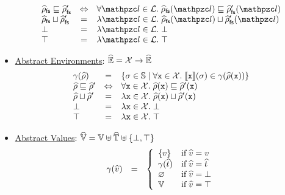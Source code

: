 \begin{itemize}
\[\begin{array}{lcl}
        \afsenv \order \afsenv' &\Leftrightarrow&
        \forall \lab \in \labset. \; \afsenv(\lab) \order \afsenv'(\lab)\\

        \afsenv \join \afsenv' &=&
        \lambda \lab \in \labset. \; \afsenv(\lab) \join \afsenv'(\lab)\\

        \bot &=& \lambda \lab \in \labset. \; \bot\\

        \top &=& \lambda \lab \in \labset. \; \top\\
      \end{array}
    \]

  \item \underline{Abstract Environments}:
    $\widehat{\mathbb{E}} = \mathcal{X} \rightarrow \widehat{\mathbb{E}}$
    \[
      \begin{array}{lcl}
        \gamma(\widehat{\rho}) &=& \{ \sigma \in \mathbb{S} \mid
          \forall \texttt{x} \in \mathcal{X}. \;
          \llbracket{\texttt{x}}\rrbracket(\sigma) \in \gamma(\widehat{\rho}(\texttt{x}))
        \}\\

        \widehat{\rho} \sqsubseteq \widehat{\rho}' &\Leftrightarrow&
        \forall \texttt{x} \in \mathcal{X}. \;
        \widehat{\rho}(\texttt{x}) \sqsubseteq \widehat{\rho}'(\texttt{x})\\

        \widehat{\rho} \sqcup \widehat{\rho}' &=&
        \lambda \texttt{x} \in \mathcal{X}. \;
        \widehat{\rho}(\texttt{x}) \sqcup \widehat{\rho}'(\texttt{x})\\

        \bot &=& \lambda \texttt{x} \in \mathcal{X}. \; \bot\\

        \top &=& \lambda \texttt{x} \in \mathcal{X}. \; \top\\
      \end{array}
    \]

  \item \underline{Abstract Values}: $\widehat{\mathbb{V}} = \mathbb{V} \uplus \widehat{\mathbb{T}} \uplus
    \{ \bot, \top \}$
    \[
      \begin{array}{lcl}
        \gamma(\widehat{v}) &=& \left\{
          \begin{array}{ll}
            \{ v \} & \text{if} \; \widehat{v} = v\\
            \gamma(\widehat{t}) & \text{if} \; \widehat{v} = \widehat{t}\\
            \varnothing & \text{if} \; \widehat{v} = \bot\\
            \mathbb{V} & \text{if} \; \widehat{v} = \top\\
          \end{array}
        \right.\\


\end{array}\]
\end{itemize}

